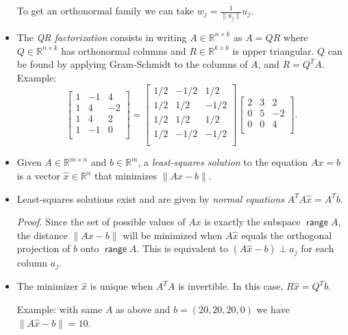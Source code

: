 \documentclass[11pt]{article}
\newcommand{\1}{\mathbf{1}}
\newcommand{\0}{\mathbf{0}}
\newcommand{\R}{\mathbb{R}}
\DeclareMathOperator{\myrange}{\mathsf{range}}
\begin{document}
\begin{itemize}
To get an orthonormal family we can take $w_j = \frac{1}{\|u_j\|} u_j$.

\item

The
\emph{QR factorization}
consists in writing $A \in \R^{n \times k}$ as $A=QR$ where $Q \in \R^{n \times k}$ has orthonormal columns and $R \in \R^{k \times k}$ is upper triangular.
$Q$ can be found by applying Gram-Schmidt to the columns of $A$, and $R = Q^T\! A$.
Example:
\[
\begin{bmatrix}
 1	& -1	&  4 \\
 1	&  4	& -2 \\
 1	&  4	&  2 \\
 1	& -1	&  0 \\
\end{bmatrix}
=
\begin{bmatrix}
 1/2	& -1/2	&  1/2 \\
 1/2	&  1/2	& -1/2 \\
 1/2	&  1/2	&  1/2 \\
 1/2	& -1/2	& -1/2 \\
\end{bmatrix}
\begin{bmatrix}
 2	&  3	&  2 \\
 0	&  5 	& -2 \\
 0	&  0	&  4 \\
\end{bmatrix}
.
\]

\item

Given $A \in \R^{m \times n}$ and $b \in \R^m$, a \emph{least-squares solution} to the equation $Ax=b$ is a vector $\hat{x} \in \R^n$ that minimizes $\|Ax-b\|$.

\item

Least-squares solutions exist and are given by \emph{normal equations} $A^T\! A \hat{x} = A^T b$.

\emph{Proof.}
Since the set of possible values of $Ax$ is exactly the subspace $\myrange A$, the distance $\|Ax-b\|$ will be minimized when $A\hat{x}$ equals the orthogonal projection of $b$ onto $\myrange A$.
This is equivalent to $(A\hat{x}-b) \perp a_j$ for each column $a_j$.

\item

The minimizer $\hat{x}$ is unique when $A^T \! A$ is invertible.
In this case, $ R \hat{x} = Q^T b $.

Example:
with same $A$ as above and $b=(20,20,20,0)$ we have $ \| A\hat{x} - b\| = 10 $.

\end{itemize}
\end{document}
